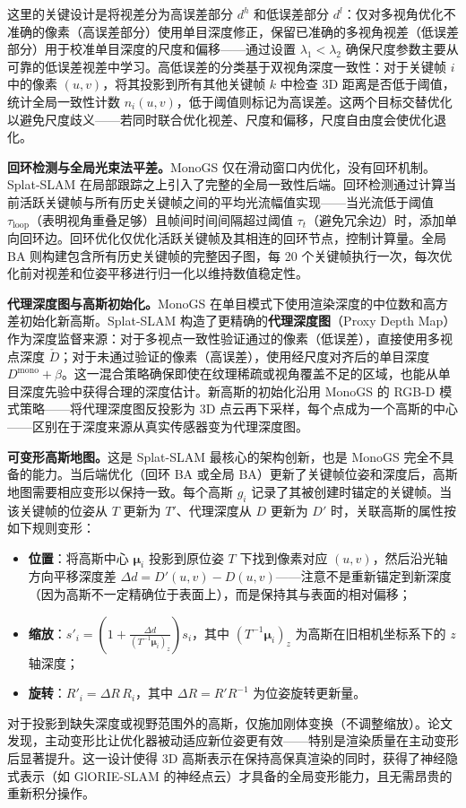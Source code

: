 这里的关键设计是将视差分为高误差部分 $d^h$ 和低误差部分 $d^l$：仅对多视角优化不准确的像素（高误差部分）使用单目深度修正，保留已准确的多视角视差（低误差部分）用于校准单目深度的尺度和偏移——通过设置 $\lambda_1 < \lambda_2$ 确保尺度参数主要从可靠的低误差视差中学习。高低误差的分类基于双视角深度一致性：对于关键帧 $i$ 中的像素 $(u,v)$，将其投影到所有其他关键帧 $k$ 中检查 3D 距离是否低于阈值，统计全局一致性计数 $n_i(u,v)$，低于阈值则标记为高误差。这两个目标交替优化以避免尺度歧义——若同时联合优化视差、尺度和偏移，尺度自由度会使优化退化。

\textbf{回环检测与全局光束法平差。}MonoGS 仅在滑动窗口内优化，没有回环机制。Splat-SLAM 在局部跟踪之上引入了完整的全局一致性后端。回环检测通过计算当前活跃关键帧与所有历史关键帧之间的平均光流幅值实现——当光流低于阈值 $\tau_{\mathrm{loop}}$（表明视角重叠足够）且帧间时间间隔超过阈值 $\tau_t$（避免冗余边）时，添加单向回环边。回环优化仅优化活跃关键帧及其相连的回环节点，控制计算量。全局 BA 则构建包含所有历史关键帧的完整因子图，每 20 个关键帧执行一次，每次优化前对视差和位姿平移进行归一化以维持数值稳定性。

\textbf{代理深度图与高斯初始化。}MonoGS 在单目模式下使用渲染深度的中位数和高方差初始化新高斯。Splat-SLAM 构造了更精确的\textbf{代理深度图}（Proxy Depth Map）作为深度监督来源：对于多视点一致性验证通过的像素（低误差），直接使用多视点深度 $\check{D}$；对于未通过验证的像素（高误差），使用经尺度对齐后的单目深度 $D^{\mathrm{mono}} + \beta$。这一混合策略确保即使在纹理稀疏或视角覆盖不足的区域，也能从单目深度先验中获得合理的深度估计。新高斯的初始化沿用 MonoGS 的 RGB-D 模式策略——将代理深度图反投影为 3D 点云再下采样，每个点成为一个高斯的中心——区别在于深度来源从真实传感器变为代理深度图。

\textbf{可变形高斯地图。}这是 Splat-SLAM 最核心的架构创新，也是 MonoGS 完全不具备的能力。当后端优化（回环 BA 或全局 BA）更新了关键帧位姿和深度后，高斯地图需要相应变形以保持一致。每个高斯 $g_i$ 记录了其被创建时锚定的关键帧。当该关键帧的位姿从 $T$ 更新为 $T'$、代理深度从 $D$ 更新为 $D'$ 时，关联高斯的属性按如下规则变形：
\begin{itemize}[itemsep=0pt,topsep=2pt,leftmargin=10pt,label=$\bullet$]
\item \textbf{位置}：将高斯中心 $\boldsymbol{\mu}_i$ 投影到原位姿 $T$ 下找到像素对应 $(u,v)$，然后沿光轴方向平移深度差 $\Delta d = D'(u,v) - D(u,v)$——注意不是重新锚定到新深度（因为高斯不一定精确位于表面上），而是保持其与表面的相对偏移；
\item \textbf{缩放}：$s'_i = \left(1 + \frac{\Delta d}{(T^{-1}\boldsymbol{\mu}_i)_z}\right) s_i$，其中 $(T^{-1}\boldsymbol{\mu}_i)_z$ 为高斯在旧相机坐标系下的 $z$ 轴深度；
\item \textbf{旋转}：$R'_i = \Delta R \, R_i$，其中 $\Delta R = R'R^{-1}$ 为位姿旋转更新量。
\end{itemize}
对于投影到缺失深度或视野范围外的高斯，仅施加刚体变换（不调整缩放）。论文发现，主动变形比让优化器被动适应新位姿更有效——特别是渲染质量在主动变形后显著提升。这一设计使得 3D 高斯表示在保持高保真渲染的同时，获得了神经隐式表示（如 GlORIE-SLAM 的神经点云）才具备的全局变形能力，且无需昂贵的重新积分操作。

